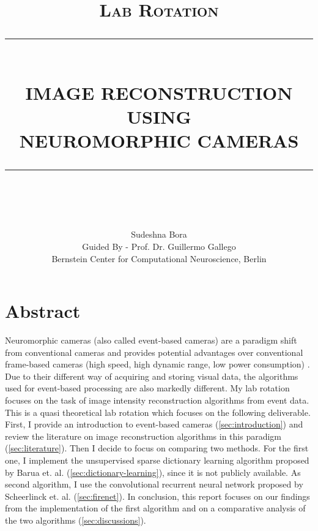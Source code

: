 \documentclass[10pt]{report}
\newcommand{\HRule}[1]{\rule{\linewidth}{#1}}
\begin{document}
\title{ \normalsize \textsc{Lab Rotation}
		\\ [2.0cm]
		\HRule{0.5pt} \\
		\LARGE \textbf{\uppercase{Image Reconstruction Using\\Neuromorphic Cameras}}
		\HRule{2pt} \\ [0.5cm]
		\normalsize  \vspace*{5\baselineskip}}

\author{
		Sudeshna Bora\\
        Guided By - Prof. Dr. Guillermo Gallego\\
Bernstein Center for Computational Neuroscience, Berlin}

\maketitle

\newpage

\tableofcontents

\newpage
\setcounter{page}{1} %
\section{Abstract}
Neuromorphic cameras (also called event-based cameras) are a paradigm shift from conventional cameras and provides potential advantages over conventional frame-based cameras (high speed, high dynamic range, low power consumption) \cite{Gallego20pami}. 
Due to their different way of acquiring and storing visual data, the algorithms used for event-based processing are also markedly different. 
My lab rotation focuses on the task of image intensity reconstruction algorithms from event data. 
This is a quasi theoretical lab rotation which focuses on the following deliverable. 
First, I provide an introduction to event-based cameras (\autoref{sec:introduction})
and review the literature on image reconstruction algorithms in this paradigm (\autoref{sec:literature}). 
Then I decide to focus on comparing two methods.
For the first one, I implement the unsupervised sparse dictionary learning algorithm proposed by Barua et. al. \cite{Barua16wacv} (\autoref{sec:dictionary-learning}), since it is not publicly available. 
As second algorithm, I use the convolutional recurrent neural network proposed by Scheerlinck et. al. \cite{Scheerlinck20wacv} (\autoref{sec:firenet}). 
In conclusion, this report focuses on our findings from the implementation of the first algorithm and on a comparative analysis of the two algorithms (\autoref{sec:discussions}).
\end{document}
